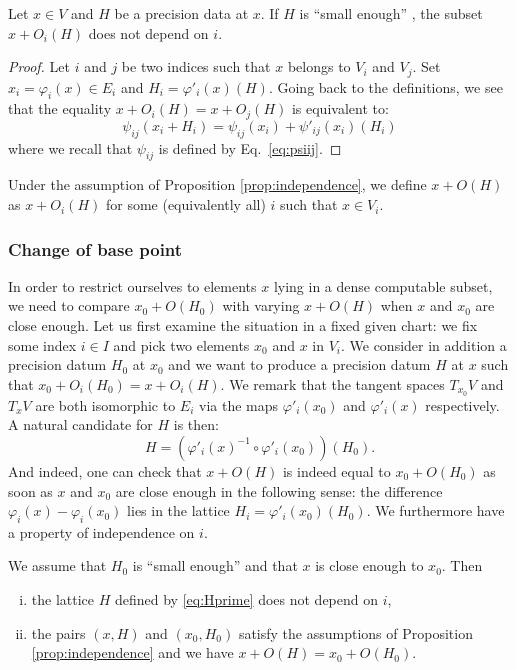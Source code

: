 \documentclass{lms}
\begin{document}
\begin{prop}
\label{prop:independence}
Let $x \in V$ and $H$ be a precision data at $x$.
If $H$ is ``small enough'' , the subset $x + 
O_i(H)$ does not depend on $i$.
\end{prop}

\begin{proof}
Let $i$ and $j$ be two indices such that $x$ belongs to $V_i$ and $V_j$. 
Set $x_i = \varphi_i(x) \in E_i$ and $H_i = \varphi'_i(x)(H)$. Going 
back to the definitions, we see that the equality $x + O_i(H) = x + 
O_j(H)$ is equivalent to:
$$\psi_{ij}(x_i + H_i) = \psi_{ij}(x_i) + \psi'_{ij}(x_i)(H_i)$$ 
where we recall that $\psi_{ij}$ is defined by Eq.~\eqref{eq:psiij}.
\end{proof}

Under the assumption of Proposition \ref{prop:independence}, we define
$x + O(H)$ as $x + O_i(H)$ for some (equivalently all) $i$ such that
$x \in V_i$.

\subsubsection*{Change of base point}

In order to restrict ourselves to elements $x$ lying in a dense 
computable subset, we need to compare $x_0 + O(H_0)$ with varying $x + 
O(H)$ when $x$ and $x_0$ are close enough.
Let us first examine the situation in a fixed given chart: we fix some 
index $i \in I$ and pick two elements $x_0$ and $x$ in $V_i$. We consider 
in addition a precision datum $H_0$ at $x_0$ and we want to produce a 
precision datum $H$ at $x$ such that $x_0 + O_i(H_0) = x + O_i(H)$. 
We remark that the tangent spaces $T_{x_0} V$ and $T_x V$ are both 
isomorphic to $E_i$ via the maps $\varphi'_i(x_0)$ and 
$\varphi'_i(x)$ respectively. A natural candidate for $H$ is then:
\begin{equation}
\label{eq:Hprime}
H = \left(\varphi'_i(x)^{-1} \circ \varphi'_i(x_0)\right) (H_0).
\end{equation}
And indeed, one can check that $x + O(H)$ is indeed equal to $x_0 + 
O(H_0)$ as soon as $x$ and $x_0$ are close enough in the following sense: 
the difference $\varphi_i(x) - \varphi_i(x_0)$ lies in the lattice $H_i = 
\varphi'_i(x_0)(H_0)$. We furthermore have a property of independence on 
$i$.

\begin{prop}
We assume that $H_0$ is ``small enough''  and that $x$ is close 
enough to $x_0$. Then
\begin{enumerate}[(i)]
\item the lattice $H$ defined by \eqref{eq:Hprime} does not depend 
on $i$,
\item the pairs $(x,H)$ and $(x_0, H_0)$ satisfy the assumptions of
Proposition \ref{prop:independence} and we have $x + O(H) = x_0 + O(H_0)$.
\end{enumerate}
\end{prop}
\end{document}
